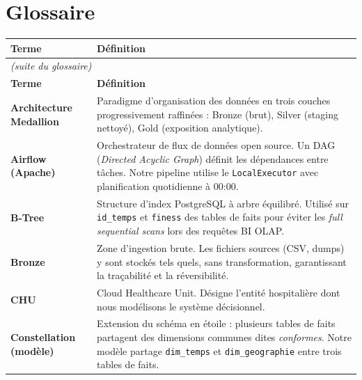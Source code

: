 \documentclass[12pt,a4paper]{report}
\begin{document}
\clearpage
\chapter*{Glossaire}

\begin{longtable}{@{} p{3.8cm} p{10.8cm} @{}}
\toprule
\textbf{Terme} & \textbf{Définition} \\ \midrule
\endfirsthead
\multicolumn{2}{l}{\small\itshape (suite du glossaire)} \\ \midrule
\textbf{Terme} & \textbf{Définition} \\ \midrule
\endhead
\bottomrule
\endfoot

\textbf{Architecture Medallion} &
    Paradigme d'organisation des données en trois couches progressivement raffinées :
    Bronze (brut), Silver (staging nettoyé), Gold (exposition analytique). \\[4pt]

\textbf{Airflow (Apache)} &
    Orchestrateur de flux de données open source. Un DAG (\textit{Directed Acyclic Graph})
    définit les dépendances entre tâches. Notre pipeline utilise le
    \texttt{LocalExecutor} avec planification quotidienne à 00:00. \\[4pt]

\textbf{B-Tree} &
    Structure d'index PostgreSQL à arbre équilibré. Utilisé sur \texttt{id\_temps}
    et \texttt{finess} des tables de faits pour éviter les \textit{full sequential
    scans} lors des requêtes BI OLAP. \\[4pt]

\textbf{Bronze} &
    Zone d'ingestion brute. Les fichiers sources (CSV, dumps) y sont stockés
    tels quels, sans transformation, garantissant la traçabilité et la
    réversibilité. \\[4pt]

\textbf{CHU} &
    Cloud Healthcare Unit. Désigne l'entité hospitalière dont nous modélisons
    le système décisionnel. \\[4pt]

\textbf{Constellation (modèle)} &
    Extension du schéma en étoile : plusieurs tables de faits partagent des
    dimensions communes dites \textit{conformes}. Notre modèle partage
    \texttt{dim\_temps} et \texttt{dim\_geographie} entre trois tables de faits. \\[4pt]


\end{longtable}
\end{document}
